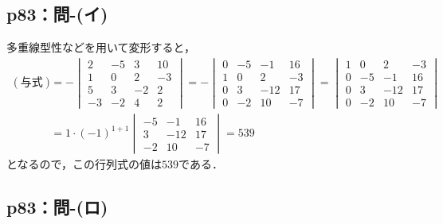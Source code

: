 \documentclass[uplatex,dvipdfmx,a4paper,10pt,fleqn]{jsarticle}
\begin{document}
\newpage 

\subsection*{p83：問-(イ)}

\begin{tleftbar}
    多重線型性などを用いて変形すると，
    \begin{align*} 
        (\text{与式}) & = -
        \begin{vmatrix} 
            2 & -5 & 3 & 10 \\
            1 & 0 & 2 & -3 \\
            5 & 3 & -2 & 2 \\
            -3 & -2 & 4 & 2 
        \end{vmatrix} 
        = - 
        \begin{vmatrix}
            0 & -5 & -1 & 16 \\
            1 & 0 & 2 & -3 \\
            0 & 3 & -12 & 17 \\
            0 & -2 & 10 & -7 
        \end{vmatrix} 
        = 
        \begin{vmatrix}
            1 & 0 & 2 & -3 \\
            0 & -5 & -1 & 16 \\
            0 & 3 & -12 & 17 \\
            0 & -2 & 10 & -7 
        \end{vmatrix} \\
        & = 1 \cdot (-1)^{1+1} 
        \begin{vmatrix} 
            -5 & -1 & 16 \\
            3 & -12 & 17 \\
            -2 & 10 & -7 
        \end{vmatrix} 
        =539 
    \end{align*} 
    となるので，この行列式の値は$539$である．
    \end{tleftbar}


    \subsection*{p83：問-(ロ)}
    
\end{document}
